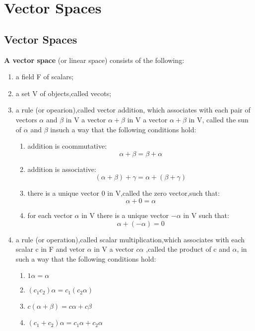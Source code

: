 \chapter{Vector Spaces}

\section{Vector Spaces}

\begin{definition}
	\textbf{A vector space} (or linear space) consists of the following:
	\begin{enumerate}
		\item a field F of scalars;
		\item a set V of objects,called vecots;
		\item a rule (or opearion),called vector addition, which associates with each pair of vectors $\alpha$ and $\beta$ in V a vector $\alpha + \beta$ in V a vector $\alpha + \beta$ in V, called the sun of $\alpha$ and $\beta$ insuch a way that the following conditions hold:
		      \begin{enumerate}
			      \item addition is coommutative: \[
				            \alpha + \beta = \beta + \alpha
			            \]
			      \item addition is associative: \[
				            (\alpha + \beta) + \gamma = \alpha + (\beta + \gamma)
			            \]
			      \item there is a unique vector 0 in V,called the zero vector,such that: \[
				            \alpha + 0 = \alpha
			            \]
			      \item for each vector $\alpha$ in V there is a unique vector $-\alpha$ in V such that: \[
				            \alpha + (-\alpha) = 0
			            \]
		      \end{enumerate}
		\item a rule (or operation),called scalar multiplication,which associates with each scalar c in F and vetor $\alpha$ in V a vector $c\alpha$ ,called the product of c and $\alpha$, in such a way that the following conditions hold:
		      \begin{enumerate}
			      \item $1\alpha = \alpha$
			      \item $(c_1c_2)\alpha = c_1(c_2\alpha)$
			      \item $c(\alpha + \beta) = c\alpha + c\beta$
			      \item $(c_1 + c_2)\alpha = c_1\alpha + c_2\alpha$
		      \end{enumerate}
	\end{enumerate}
\end{definition}
